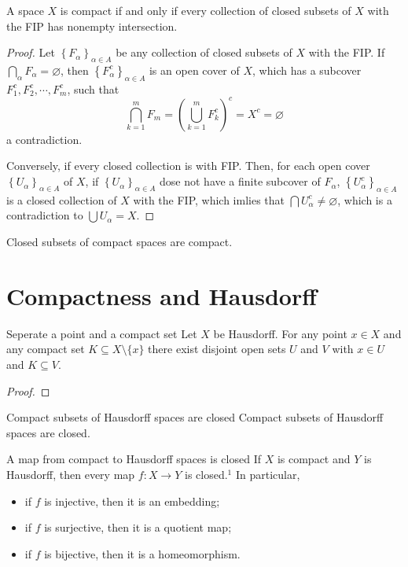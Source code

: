 \documentclass[../main.tex]{subfiles}
\begin{document}
\begin{theorem}{}{}
A space $X$ is compact if and only if every collection of closed subsets of $X$ with the FIP has nonempty intersection.
\end{theorem}
\begin{proof}
    Let \(  \left\{ F_{\alpha } \right\}_{\alpha \in A}  \) be any collection of closed subsets of \(  X  \) with the FIP. If \(  \bigcap _{\alpha }F_{\alpha }= \varnothing  \), then \(  \left\{ F_{\alpha }^{c} \right\}_{\alpha \in A}  \) is an open cover of \(  X  \), which has a subcover \(  F_1^{c},F_2^{c},\cdots ,F_{m}^{c}  \), such that  \[
    \bigcap _{k= 1}^{m}F_{m}= \left( \bigcup _{k= 1}^{m}F_{k}^{c} \right)^{c}= X^{c}= \varnothing 
    \]a contradiction.
    
    
    Conversely, if every closed collection is with FIP. Then, for each open cover \(  \left\{ U_{\alpha } \right\}_{\alpha \in A}  \) of \(  X  \), if \(  \left\{ U_{\alpha } \right\}_{\alpha \in A}   \) dose not have a finite subcover of \(  F_{\alpha }  \), \(  \left\{ U_{\alpha }^{c} \right\}_{\alpha \in A}  \) is  a closed collection of \(  X  \) with the FIP, which imlies that \(  \bigcap U_{\alpha }^{c}\neq \varnothing  \), which is a contradiction to \(  \bigcup U_{\alpha }= X  \).  
\end{proof}
\begin{theorem}{}{}
Closed subsets of compact spaces are compact.
\end{theorem}

\section{Compactness and Hausdorff}

\begin{theorem}{Seperate a point and a compact set}{}
Let $X$ be Hausdorff. For any point $x \in X$ and any compact set $K \subseteq X \setminus \{x\}$ there exist disjoint open sets $U$ and $V$ with $x \in U$ and $K \subseteq V$.
\end{theorem}
\begin{proof}
    
\end{proof}

\begin{corollary}{Compact subsets of Hausdorff spaces are closed}{}
Compact subsets of Hausdorff spaces are closed.
\end{corollary}
\begin{corollary}{A map from compact to Hausdorff spaces is closed}{}
If $X$ is compact and $Y$ is Hausdorff, then every map $f: X \to Y$ is closed.$^1$ In particular,
\begin{itemize}
    \item if $f$ is injective, then it is an embedding;
    \item if $f$ is surjective, then it is a quotient map;
    \item if $f$ is bijective, then it is a homeomorphism.
\end{itemize}
\end{corollary}
\end{document}
